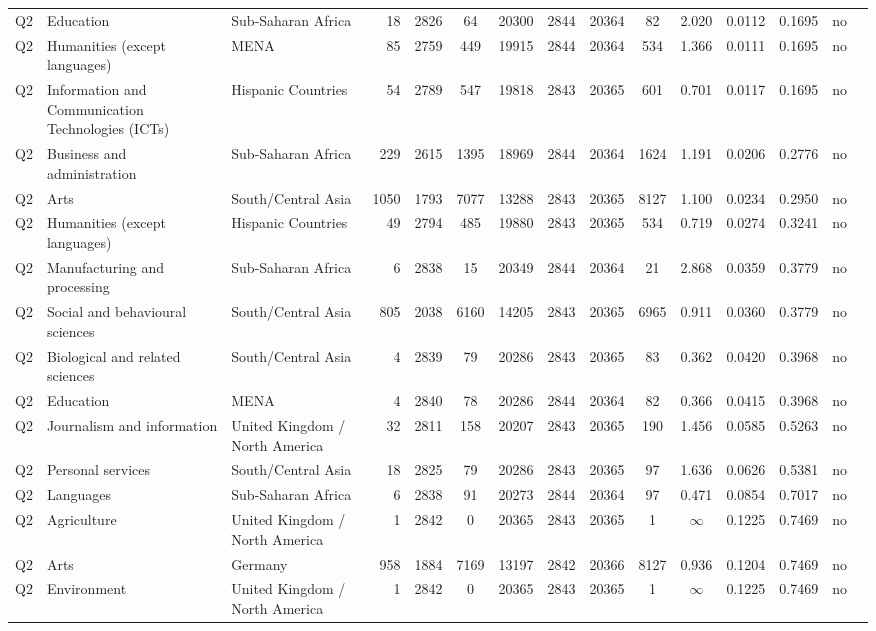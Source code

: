 \begin{longtable}{lllrcccccccccll}
Q2 & Education & Sub-Saharan Africa & 18 & 2826 & 64 & 20300 & 2844 & 20364 & 82 & 2.020 & 0.0112 & 0.1695 & no \\
Q2 & Humanities (except languages) & MENA & 85 & 2759 & 449 & 19915 & 2844 & 20364 & 534 & 1.366 & 0.0111 & 0.1695 & no \\
Q2 & Information and Communication Technologies (ICTs) & Hispanic Countries & 54 & 2789 & 547 & 19818 & 2843 & 20365 & 601 & 0.701 & 0.0117 & 0.1695 & no \\
Q2 & Business and administration & Sub-Saharan Africa & 229 & 2615 & 1395 & 18969 & 2844 & 20364 & 1624 & 1.191 & 0.0206 & 0.2776 & no \\
Q2 & Arts & South/Central Asia & 1050 & 1793 & 7077 & 13288 & 2843 & 20365 & 8127 & 1.100 & 0.0234 & 0.2950 & no \\
Q2 & Humanities (except languages) & Hispanic Countries & 49 & 2794 & 485 & 19880 & 2843 & 20365 & 534 & 0.719 & 0.0274 & 0.3241 & no \\
Q2 & Manufacturing and processing & Sub-Saharan Africa & 6 & 2838 & 15 & 20349 & 2844 & 20364 & 21 & 2.868 & 0.0359 & 0.3779 & no \\
Q2 & Social and behavioural sciences & South/Central Asia & 805 & 2038 & 6160 & 14205 & 2843 & 20365 & 6965 & 0.911 & 0.0360 & 0.3779 & no \\
Q2 & Biological and related sciences & South/Central Asia & 4 & 2839 & 79 & 20286 & 2843 & 20365 & 83 & 0.362 & 0.0420 & 0.3968 & no \\
Q2 & Education & MENA & 4 & 2840 & 78 & 20286 & 2844 & 20364 & 82 & 0.366 & 0.0415 & 0.3968 & no \\
Q2 & Journalism and information & United Kingdom / North America & 32 & 2811 & 158 & 20207 & 2843 & 20365 & 190 & 1.456 & 0.0585 & 0.5263 & no \\
Q2 & Personal services & South/Central Asia & 18 & 2825 & 79 & 20286 & 2843 & 20365 & 97 & 1.636 & 0.0626 & 0.5381 & no \\
Q2 & Languages & Sub-Saharan Africa & 6 & 2838 & 91 & 20273 & 2844 & 20364 & 97 & 0.471 & 0.0854 & 0.7017 & no \\
Q2 & Agriculture & United Kingdom / North America & 1 & 2842 & 0 & 20365 & 2843 & 20365 & 1 & $\infty$ & 0.1225 & 0.7469 & no \\
Q2 & Arts & Germany & 958 & 1884 & 7169 & 13197 & 2842 & 20366 & 8127 & 0.936 & 0.1204 & 0.7469 & no \\
Q2 & Environment & United Kingdom / North America & 1 & 2842 & 0 & 20365 & 2843 & 20365 & 1 & $\infty$ & 0.1225 & 0.7469 & no \\

\end{longtable}

